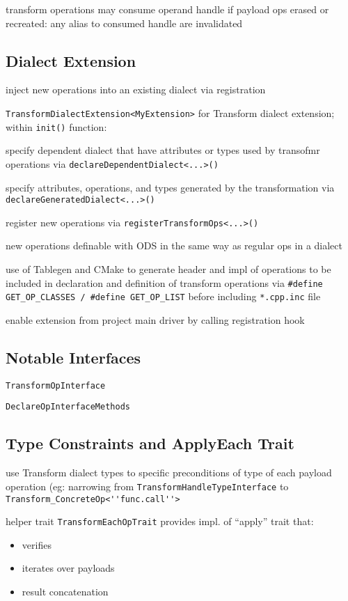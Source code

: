 \documentclass[8pt]{extarticle}
\begin{document}
\begin{multicols*}{2}
transform operations may consume operand handle if payload ops erased or recreated: any alias to consumed handle are invalidated

\subsection{Dialect Extension}
inject new operations into an existing dialect via registration

\verb|TransformDialectExtension<MyExtension>| for Transform dialect extension; within \verb|init()| function:

specify dependent dialect that have attributes or types used by transofmr operations via \verb|declareDependentDialect<...>()|

specify attributes, operations, and types generated by the transformation via  \verb|declareGeneratedDialect<...>()|

register new operations via \verb|registerTransformOps<...>()|

new operations definable with ODS in the same way as regular ops in a dialect

use of Tablegen and CMake to generate header and impl of operations to be included in declaration and definition of transform operations via \verb|#define GET_OP_CLASSES / #define GET_OP_LIST| before including \verb|*.cpp.inc| file

enable extension from project main driver by calling registration hook

\subsection{Notable Interfaces}

\verb|TransformOpInterface|

\verb|DeclareOpInterfaceMethods|

\subsection{Type Constraints and ApplyEach Trait}
use Transform dialect types to specific preconditions of type of each payload operation (eg: narrowing from \verb|TransformHandleTypeInterface| to \verb|Transform_ConcreteOp<''func.call''>|

helper trait \verb|TransformEachOpTrait| provides impl. of ``apply'' trait that:
\begin{itemize}
\item verifies
\item iterates over payloads
\item result concatenation
\end{itemize}


\end{multicols*}
\end{document}

